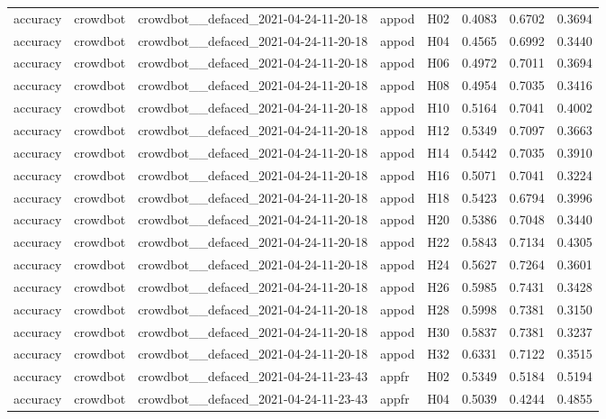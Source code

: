 \begin{table}[tbp]
\begin{tabular}{lllllrrr}
accuracy & crowdbot & crowdbot\_\_defaced\_2021-04-24-11-20-18 & appod & H02 & 0.4083 & 0.6702 & 0.3694 \\
accuracy & crowdbot & crowdbot\_\_defaced\_2021-04-24-11-20-18 & appod & H04 & 0.4565 & 0.6992 & 0.3440 \\
accuracy & crowdbot & crowdbot\_\_defaced\_2021-04-24-11-20-18 & appod & H06 & 0.4972 & 0.7011 & 0.3694 \\
accuracy & crowdbot & crowdbot\_\_defaced\_2021-04-24-11-20-18 & appod & H08 & 0.4954 & 0.7035 & 0.3416 \\
accuracy & crowdbot & crowdbot\_\_defaced\_2021-04-24-11-20-18 & appod & H10 & 0.5164 & 0.7041 & 0.4002 \\
accuracy & crowdbot & crowdbot\_\_defaced\_2021-04-24-11-20-18 & appod & H12 & 0.5349 & 0.7097 & 0.3663 \\
accuracy & crowdbot & crowdbot\_\_defaced\_2021-04-24-11-20-18 & appod & H14 & 0.5442 & 0.7035 & 0.3910 \\
accuracy & crowdbot & crowdbot\_\_defaced\_2021-04-24-11-20-18 & appod & H16 & 0.5071 & 0.7041 & 0.3224 \\
accuracy & crowdbot & crowdbot\_\_defaced\_2021-04-24-11-20-18 & appod & H18 & 0.5423 & 0.6794 & 0.3996 \\
accuracy & crowdbot & crowdbot\_\_defaced\_2021-04-24-11-20-18 & appod & H20 & 0.5386 & 0.7048 & 0.3440 \\
accuracy & crowdbot & crowdbot\_\_defaced\_2021-04-24-11-20-18 & appod & H22 & 0.5843 & 0.7134 & 0.4305 \\
accuracy & crowdbot & crowdbot\_\_defaced\_2021-04-24-11-20-18 & appod & H24 & 0.5627 & 0.7264 & 0.3601 \\
accuracy & crowdbot & crowdbot\_\_defaced\_2021-04-24-11-20-18 & appod & H26 & 0.5985 & 0.7431 & 0.3428 \\
accuracy & crowdbot & crowdbot\_\_defaced\_2021-04-24-11-20-18 & appod & H28 & 0.5998 & 0.7381 & 0.3150 \\
accuracy & crowdbot & crowdbot\_\_defaced\_2021-04-24-11-20-18 & appod & H30 & 0.5837 & 0.7381 & 0.3237 \\
accuracy & crowdbot & crowdbot\_\_defaced\_2021-04-24-11-20-18 & appod & H32 & 0.6331 & 0.7122 & 0.3515 \\
accuracy & crowdbot & crowdbot\_\_defaced\_2021-04-24-11-23-43 & appfr & H02 & 0.5349 & 0.5184 & 0.5194 \\
accuracy & crowdbot & crowdbot\_\_defaced\_2021-04-24-11-23-43 & appfr & H04 & 0.5039 & 0.4244 & 0.4855 \\

\end{tabular}
\end{table}
